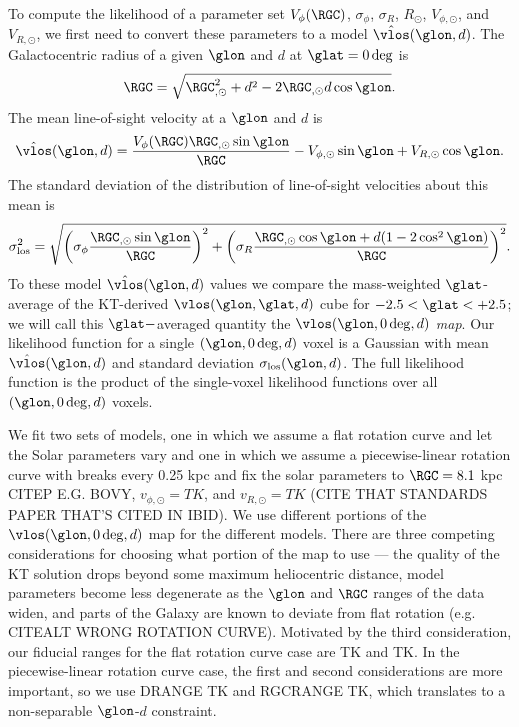 To compute the likelihood of a parameter set $V_\phi (\RGC)$, $\sigma_\phi$, $\sigma_R$, $R_{\odot}$, $V_{\phi, \odot}$, and $V_{R, \odot}$, we first need to convert these parameters to a model $\hat{\vlos}(\glon, d)$. 
The Galactocentric radius of a given $\glon$ and $d$ at $\glat = 0 \deg$ is 
\begin{equation}
\RGC = \sqrt{\RGC^2_{,\odot} + d^2 - 2 \RGC_{, \odot} d \cos \glon}.
\end{equation}
The mean line-of-sight velocity at a $\glon$ and $d$ is
\begin{equation}
\label{eqn:vlos_mean}
\hat{\vlos}(\glon, d) = \frac{V_\phi (\RGC) \RGC_{,\odot} \sin\glon}{\RGC}  - V_{\phi, \odot} \sin \glon + V_{R, \odot} \cos \glon.
\end{equation}
The standard deviation of the distribution of line-of-sight velocities about this mean is 
\begin{equation}
\label{eqn:vlos_var}
\sigma^2_\mathrm{los} = \sqrt{\left(\sigma_\phi \frac{\RGC_{,\odot} \sin \glon}{\RGC} \right)^2 + 
\left(\sigma_R  \frac{\RGC_{,\odot} \cos \glon + d (1 - 2 \cos^2 \glon)}{\RGC} \right)^2}.
\end{equation}
To these model $\hat{\vlos}(\glon, d)$ values we compare the mass-weighted $\glat$-average of the KT-derived $\vlos(\glon, \glat, d)$ cube for $-2.5 < \glat < + 2.5$; we will call this $\glat-$averaged quantity the $\vlos(\glon, 0 \deg, d)$ \emph{map}.
Our likelihood function for a single $(\glon, 0\deg, d)$ voxel is a Gaussian with mean $\hat{\vlos}(\glon, d)$ and standard deviation $\sigma_\mathrm{los}(\glon, d)$.
The full likelihood function is the product of the single-voxel likelihood functions over all $(\glon, 0\deg, d)$ voxels.

We fit two sets of models, one in which we assume a flat rotation curve and let the Solar parameters vary and one in which we assume a piecewise-linear rotation curve with breaks every 0.25 kpc and fix the solar parameters to $\RGC=8.1$ kpc CITEP E.G. BOVY, $v_{\phi, \odot}=TK$, and $v_{R, \odot}=TK$ (CITE THAT STANDARDS PAPER THAT'S CITED IN IBID).
We use different portions of the $\vlos(\glon, 0\deg, d)$ map for the different models. 
There are three competing considerations for choosing what portion of the map to use --- the quality of the KT solution drops beyond some maximum heliocentric distance, model parameters become less degenerate as the $\glon$ and $\RGC$ ranges of the data widen, and parts of the Galaxy are known to deviate from flat rotation (e.g. CITEALT WRONG ROTATION CURVE). 
Motivated by the third consideration, our fiducial ranges for the flat rotation curve case are TK and TK. 
In the piecewise-linear rotation curve case, the first and second considerations are more important, so we use DRANGE TK and RGCRANGE TK, which translates to a non-separable $\glon$-$d$ constraint.

